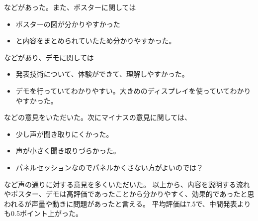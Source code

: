 \documentclass[openany,11pt,papersize]{jsbook}
\begin{document}
などがあった。また、ポスターに関しては
\begin{itemize}

\item ポスターの図が分かりやすかった
\item と内容をまとめられていたため分かりやすかった。

\end{itemize}

などがあり、デモに関しては
\begin{itemize}

\item 発表技術について、体験ができて、理解しやすかった。
\item デモを行っていてわかりやすい。大きめのディスプレイを使っていてわかりやすかった。

\end{itemize}

などの意見をいただいた。次にマイナスの意見に関しては、
\begin{itemize}

\item 少し声が聞き取りにくかった。
\item 声が小さく聞き取りづらかった。
\item パネルセッションなのでパネルかくさない方がよいのでは？

\end{itemize}
など声の通りに対する意見を多くいただいた。
以上から、内容を説明する流れやポスター、デモは高評価であったことから分かりやすく、効果的であったと思われるが声量や動きに問題があったと言える。
平均評価は7.5で、中間発表よりも0.5ポイント上がった。

\end{document}
